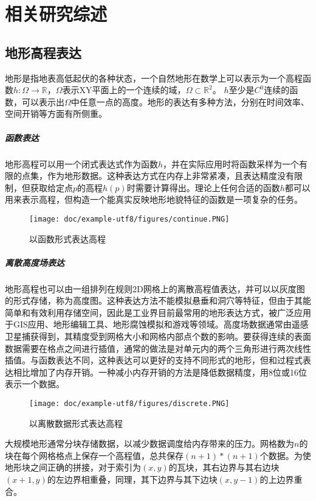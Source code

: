 
\chapter{相关研究综述}
\section{地形高程表达}
地形是指地表高低起伏的各种状态，一个自然地形在数学上可以表示为一个高程函数$h:\Omega\to\mathbb{R}$，$\Omega$表示XY平面上的一个连续的域，$\Omega \subset \mathbb{R}^2$。 $h$至少是$C^0$连续的函数，可以表示出$\Omega$中任意一点的高度。地形的表达有多种方法，分别在时间效率、空间开销等方面有所侧重。
\paragraph{函数表达}地形高程可以用一个闭式表达式作为函数$h$，并在实际应用时将函数采样为一个有限的点集，作为地形数据\supercite{CignoniRepresentation}。这种表达方式在内存上非常紧凑，且表达精度没有限制，但获取给定点$p$的高程$h(p)$时需要计算得出。理论上任何合适的函数$h$都可以用来表示高程，但构造一个能真实反映地形地貌特征的函数是一项复杂的任务。
\begin{figure}[htbp]
\centering
\texttt{[image: doc/example-utf8/figures/continue.PNG]}
\caption{以函数形式表达高程\supercite{eric-review}}
\end{figure}
\paragraph{离散高度场表达}地形高程也可以由一组排列在规则2D网格上的离散高程值表达，并可以以灰度图的形式存储，称为高度图。这种表达方法不能模拟悬垂和洞穴等特征，但由于其能简单和有效利用存储空间，因此是工业界目前最常用的地形表达方式，被广泛应用于GIS应用、地形编辑工具、地形腐蚀模拟和游戏等领域。高度场数据通常由遥感卫星捕获得到，其精度受到网格大小和网格内部点个数的影响。要获得连续的表面数据需要在格点之间进行插值，通常的做法是对单元内的两个三角形进行两次线性插值。与函数表达不同，这种表达可以更好的支持不同形式的地形，但和过程式表达相比增加了内存开销。一种减小内存开销的方法是降低数据精度，用8位或16位表示一个数据。
\begin{figure}[htbp]
\centering
\texttt{[image: doc/example-utf8/figures/discrete.PNG]}
\caption{以离散数据形式表达高程\supercite{eric-review}}
\end{figure}
大规模地形通常分块存储数据，以减少数据调度给内存带来的压力。网格数为$n$的块在每个网格格点上保存一个高程值，总共保存$(n+1)*(n+1)$个数据。为使地形块之间正确的拼接，对于索引为$(x,y)$的瓦块，其右边界与其右边块$(x+1,y)$的左边界相重叠，同理，其下边界与其下边块$(x,y-1)$的上边界重合。

